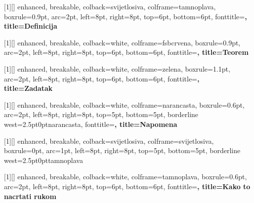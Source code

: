 \setcounter{secnumdepth}{3}
\setcounter{tocdepth}{2}

\pagestyle{fancy}
\fancyhf{}
\fancyhead[L]{\small\nouppercase{\leftmark}}
\fancyhead[R]{\small\thepage}
\renewcommand{\headrulewidth}{0.4pt}
\fancypagestyle{plain}{\fancyhf{}\fancyfoot[C]{\small\thepage}%
  \renewcommand{\headrulewidth}{0pt}}

\setlength{\parindent}{0pt}
\setlength{\parskip}{0.55em}
\renewcommand{\arraystretch}{1.15}


[1][]{%
  enhanced, breakable, colback=svijetlosiva, colframe=tamnoplava,
  boxrule=0.9pt, arc=2pt, left=8pt, right=8pt, top=6pt, bottom=6pt,
  fonttitle=\bfseries\color{white},
  title={Definicija~\thetcbcounter{}}}

[1][]{%
  enhanced, breakable, colback=white, colframe=fsbcrvena,
  boxrule=0.9pt, arc=2pt, left=8pt, right=8pt, top=6pt, bottom=6pt,
  fonttitle=\bfseries\color{white},
  title={Teorem~\thetcbcounter{}}}

[1][]{%
  enhanced, breakable, colback=white, colframe=zelena,
  boxrule=1.1pt, arc=2pt, left=8pt, right=8pt, top=6pt, bottom=6pt,
  fonttitle=\bfseries\color{white},
  title={Zadatak~\thetcbcounter{}}}

[1][]{%
  enhanced, breakable, colback=white, colframe=narancasta,
  boxrule=0.6pt, arc=2pt, left=8pt, right=8pt, top=5pt, bottom=5pt,
  borderline west={2.5pt}{0pt}{narancasta},
  fonttitle=\bfseries\color{white},
  title={Napomena}}

[1][]{%
  enhanced, breakable, colback=svijetlosiva, colframe=svijetlosiva,
  boxrule=0pt, arc=1pt, left=8pt, right=8pt, top=5pt, bottom=5pt,
  borderline west={2.5pt}{0pt}{tamnoplava}}

[1][]{%
  enhanced, breakable, colback=white, colframe=tamnoplava,
  boxrule=0.6pt, arc=2pt, left=8pt, right=8pt, top=6pt, bottom=6pt,
  fonttitle=\bfseries\color{white},
  title={Kako to nacrtati rukom}}

